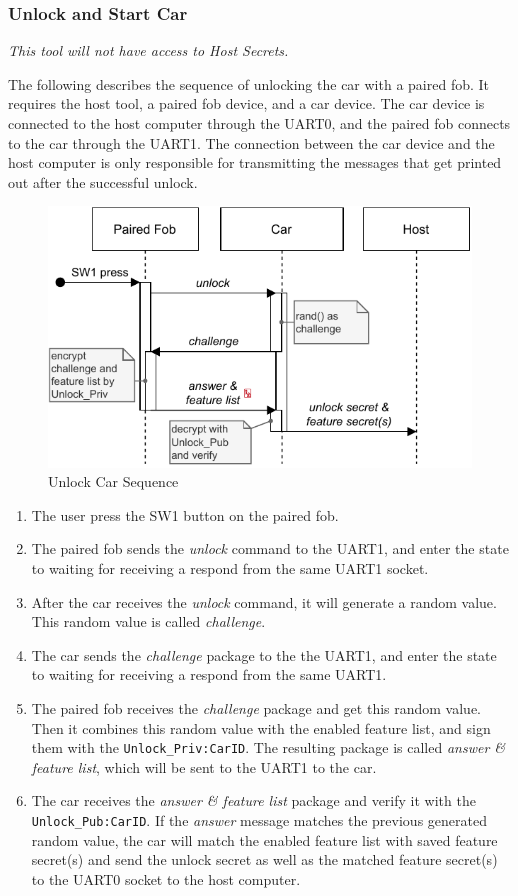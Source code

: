 \documentclass[11pt,oneside,onecolumn,letterpaper]{article}
\begin{document}
\subsubsection{Unlock and Start Car}

\textit{This tool will not have access to Host Secrets.}

The following describes the sequence of unlocking the car with a paired fob. It requires the host tool, a paired fob device, and a car device. The car device is connected to the host computer through the UART0, and the paired fob connects to the car through the UART1. The connection between the car device and the host computer is only responsible for transmitting the messages that get printed out after the successful unlock.

\begin{figure}[!htbp]
	\begin{centering}
		\includegraphics[width = .6\textwidth]{pic/unlock.pdf}
		\caption{Unlock Car Sequence}
		\label{fig:unlock}
	\end{centering}	
\end{figure}

\begin{enumerate}
	\item The user press the SW1 button on the paired fob.
	\item The paired fob sends the \textit{unlock} command to the UART1, and enter the state to waiting for receiving a respond from the same UART1 socket.
	\item After the car receives the \textit{unlock} command, it will generate a random value. This random value is called \textit{challenge}.
	\item The car sends the \textit{challenge} package to the the UART1, and enter the state to waiting for receiving a respond from the same UART1.
	\item The paired fob receives the \textit{challenge} package and get this random value. Then it combines this random value with the enabled feature list, and sign them with the \verb|Unlock_Priv:CarID|. The resulting package is called \textit{answer \& feature list}, which will be sent to the UART1 to the car.
	\item The car receives the \textit{answer \& feature list} package and verify it with the \verb|Unlock_Pub:CarID|. If the \textit{answer} message matches the previous generated random value, the car will match the enabled feature list with saved feature secret(s) and send the unlock secret as well as the matched feature secret(s) to the UART0 socket to the host computer.
\end{enumerate}
\end{document}
